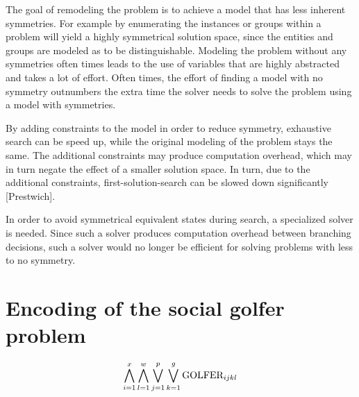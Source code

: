 \documentclass[a4paper]{scrartcl}
\begin{document}
The goal of remodeling the problem is to achieve a model that has less inherent symmetries. For example by enumerating the instances or groups within a problem will yield a highly symmetrical solution space, since the entities and groups are modeled as to be distinguishable. Modeling the problem without any symmetries often times leads to the use of variables that are highly abstracted and takes a lot of effort. Often times, the effort of finding a model with no symmetry outnumbers the extra time the solver needs to solve the problem using a model with symmetries.

By adding constraints to the model in order to reduce symmetry, exhaustive search can be speed up, while the original modeling of the problem stays the same. The additional constraints may produce computation overhead, which may in turn negate the effect of a smaller solution space. In turn, due to the additional constraints, first-solution-search can be slowed down significantly [Prestwich].

In order to avoid symmetrical equivalent states during search, a specialized solver is needed. Since such a solver produces computation overhead between branching decisions, such a solver would no longer be efficient for solving problems with less to no symmetry.






\section{Encoding of the social golfer problem}

\begin{equation}
\centering
    \bigwedge \limits_{i=1}^x 
    \bigwedge \limits_{l=1}^w 
    \bigvee \limits_{j=1}^p
    \bigvee \limits_{k=1}^g 
    \text{GOLFER}_{ijkl}
\end{equation}
\end{document}
